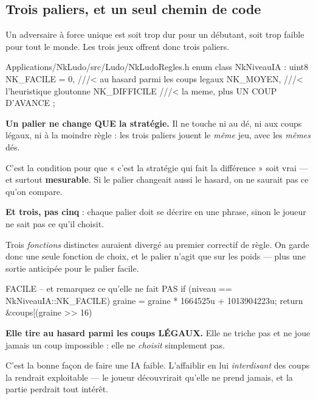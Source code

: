 \subsection{Trois paliers, et un seul chemin de code}

Un adversaire à force unique est soit trop dur pour un débutant, soit trop
faible pour tout le monde. Les trois jeux offrent donc trois paliers.

\begin{nkcode}{Applications/NkLudo/src/Ludo/NkLudoRegles.h}
enum class NkNiveauIA : uint8 {
    NK_FACILE = 0, ///< au hasard parmi les coups legaux
    NK_MOYEN,      ///< l'heuristique gloutonne
    NK_DIFFICILE   ///< la meme, plus UN COUP D'AVANCE
};
\end{nkcode}

\begin{nkretenir}
\textbf{Un palier ne change QUE la stratégie.} Il ne touche ni au dé, ni aux
coups légaux, ni à la moindre règle : les trois paliers jouent le \emph{même}
jeu, avec les \emph{mêmes} dés.

C'est la condition pour que « c'est la stratégie qui fait la différence » soit
vrai --- et surtout \textbf{mesurable}. Si le palier changeait aussi le hasard,
on ne saurait pas ce qu'on compare.

\textbf{Et trois, pas cinq} : chaque palier doit se décrire en une phrase, sinon
le joueur ne sait pas ce qu'il choisit.
\end{nkretenir}

\begin{nkretenir}
Trois \emph{fonctions} distinctes auraient divergé au premier correctif de règle.
On garde donc une seule fonction de choix, et le palier n'agit que sur les
poids --- plus une sortie anticipée pour le palier facile.
\end{nkretenir}

\begin{nkcode}{FACILE -- et remarquez ce qu'elle ne fait PAS}
if (niveau == NkNiveauIA::NK_FACILE) {
    graine = graine * 1664525u + 1013904223u;
    return &coups[(graine >> 16) %
}
\end{nkcode}

\begin{nkretenir}
\textbf{Elle tire au hasard parmi les coups LÉGAUX.} Elle ne triche pas et ne
joue jamais un coup impossible : elle ne \emph{choisit} simplement pas.

C'est la bonne façon de faire une IA faible. L'affaiblir en lui \emph{interdisant}
des coups la rendrait exploitable --- le joueur découvrirait qu'elle ne prend
jamais, et la partie perdrait tout intérêt.
\end{nkretenir}

